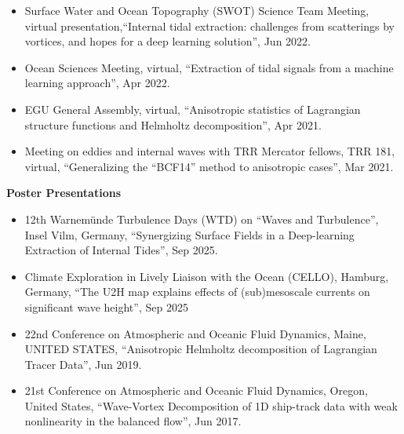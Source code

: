 \documentclass[a4paper,12pt]{article}
\begin{document}
\begin{itemize}[leftmargin=*,noitemsep]
\item Surface Water and Ocean Topography (SWOT) Science Team Meeting, virtual presentation,``Internal tidal extraction: challenges from scatterings by vortices, and hopes for a deep learning solution”, Jun 2022.
\item Ocean Sciences Meeting, virtual, ``Extraction of tidal signals from a machine learning approach”, Apr 2022.
\item EGU General Assembly, virtual, ``Anisotropic statistics of Lagrangian structure functions and Helmholtz decomposition”, Apr 2021.
\item Meeting on eddies and internal waves with TRR Mercator fellows, TRR 181, virtual, ``Generalizing the “BCF14” method to anisotropic cases”, Mar 2021.
\end{itemize}
\textbf{Poster Presentations}
\begin{itemize}[leftmargin=*,noitemsep]
\item 12th Warnem\"{u}nde Turbulence Days (WTD) on ``Waves and Turbulence'', Insel Vilm, Germany, ``Synergizing Surface Fields in a Deep-learning Extraction of Internal Tides'', Sep 2025.
\item  Climate Exploration in Lively Liaison with the Ocean (CELLO), Hamburg, Germany, ``The  U2H map  explains effects of (sub)mesoscale currents on significant wave height'', Sep 2025
\item 22nd Conference on Atmospheric and Oceanic Fluid Dynamics, Maine, UNITED STATES, ``Anisotropic Helmholtz decomposition of Lagrangian Tracer Data”, Jun 2019.
\item 21st Conference on Atmospheric and Oceanic Fluid Dynamics, Oregon, United States, ``Wave-Vortex Decomposition of 1D ship-track data with weak nonlinearity in the balanced flow”, Jun 2017.
\end{itemize}
\end{document}
